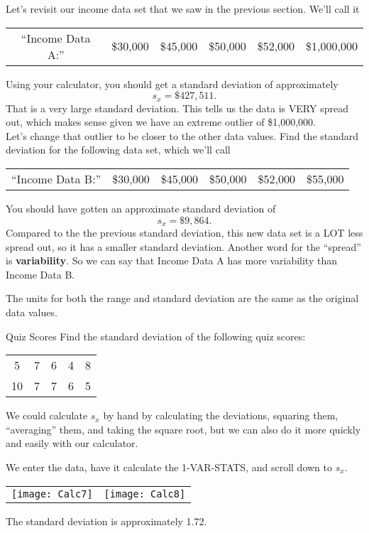 Let's revisit our income data set that we saw in the previous section. We'll call it
\begin{center}
\begin{tabular}{c c c c c c}
``Income Data A:'' & \$30,000 & \$45,000 & \$50,000 & \$52,000 & \$1,000,000
\end{tabular}
\end{center}
Using your calculator, you should get a standard deviation of approximately \[s_x = \$427,511.\] That is a very large standard deviation. This tells us the data is VERY spread out, which makes sense given we have an extreme outlier of \$1,000,000. \\

Let's change that outlier to be closer to the other data values. Find the standard deviation for the following data set, which we'll call
\begin{center}
\begin{tabular}{c c c c c c}
``Income Data B:'' & \$30,000 & \$45,000 & \$50,000 & \$52,000 & \$55,000
\end{tabular}
\end{center}
You should have gotten an approximate standard deviation of \[s_x = \$9,864.\] Compared to the the previous standard deviation, this new data set is a LOT less spread out, so it has a smaller standard deviation. Another word for the ``spread'' is \textbf{variability}. So we can say that Income Data A has more variability than Income Data B.

The units for both the range and standard deviation are the same as the original data values. 

\begin{example}[https://www.youtube.com/watch?v=IcvKZ30IJ4A]{Quiz Scores}
Find the standard deviation of the following quiz scores:
\begin{center}
\begin{tabular}{c c c c c}
5 & 7 & 6 & 4 & 8\\
10 & 7 & 7 & 6 & 5
\end{tabular}
\end{center}

We could calculate $s_x$ by hand by calculating the deviations, squaring them, ``averaging'' them, and taking the square root, but we can also do it more quickly and easily with our calculator.

We enter the data, have it calculate the 1-VAR-STATS, and scroll down to $s_x$.
\begin{center}
\begin{tabular}{c c}
\texttt{[image: Calc7]} & \texttt{[image: Calc8]}
\end{tabular}
\end{center}

The standard deviation is approximately 1.72.
\end{example}

